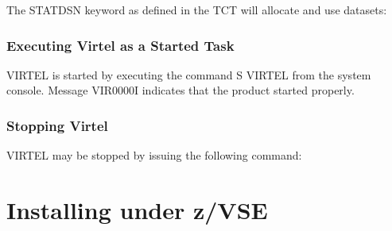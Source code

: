 \documentclass[letterpaper,10pt,english]{sphinxmanual}
\begin{document}
\sphinxAtStartPar
The STATDSN keyword as defined in the TCT will allocate and use datasets:\sphinxhyphen{}

\begin{sphinxVerbatim}[commandchars=\\\{\}]
  
\end{sphinxVerbatim}


\subsection{Executing Virtel as a Started Task}
\label{\detokenize{Installation_Guide:executing-virtel-as-a-started-task}}
\sphinxAtStartPar
VIRTEL is started by executing the command S VIRTEL from the system console. Message VIR0000I indicates that the product started properly.


\subsection{Stopping Virtel}
\label{\detokenize{Installation_Guide:stopping-virtel}}
\sphinxAtStartPar
VIRTEL may be stopped by issuing the following command:\sphinxhyphen{}

\begin{sphinxVerbatim}[commandchars=\\\{\}]
 
\end{sphinxVerbatim}

\ignorespaces 

\chapter{Installing under z/VSE}
\label{\detokenize{Installation_Guide:installing-under-z-vse}}\label{\detokenize{Installation_Guide:index-16}}
\ignorespaces 
\end{document}
